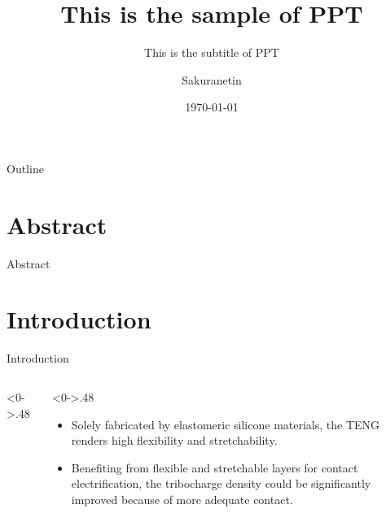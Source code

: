 \documentclass[aspectratio=149,12pt]{beamer}
\title{This is the sample of PPT}
\subtitle{This is the subtitle of PPT}
\author{Sakuranetin}
\institute{Southern University of Science and Technology}
\date{\today}
\begin{document}

\frame{\titlepage}

\begin{frame}{Outline}
\tableofcontents
\end{frame}

\section{Abstract}
\begin{frame}{Abstract}

\end{frame}


\section{Introduction}
\begin{frame}{Introduction}
	\begin{columns}[T] %
		\begin{column}<0->{.48\textwidth}
		\begin{figure}[thpb]
			\centering
			\label{fig:Introduction}
		\end{figure}
		\end{column}%
		\begin{column}<0->{.48\paperwidth}
		\begin{itemize}
			\item Solely
			fabricated by elastomeric silicone materials, the TENG renders
			high \alert{flexibility} and \alert{stretchability}.
			\item Benefiting from flexible
			and stretchable layers for contact electrification, the \alert{tribocharge density} could be significantly improved because of more adequate contact.
		\end{itemize}
		\end{column}%
	\end{columns}
\end{frame}
\end{document}
